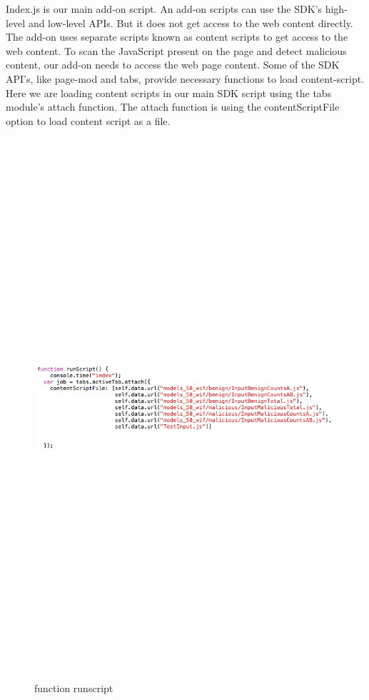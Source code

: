 Index.js is our main add-on script. An add-on scripts can use the SDK's high-level and low-level APIs. But it does not get access to the web content directly. The add-on uses separate scripts known as content scripts to get access to the web content.  To scan the JavaScript present on the page and detect malicious content, our add-on needs to access the web page content. Some of the SDK API's, like page-mod and tabs, provide necessary functions to load content-script. Here we are loading content scripts in our main SDK script using the tabs module's attach function. The attach function is using the contentScriptFile option to load content script as a file. 

\begin{figure}[htb]
\centering
\includegraphics[width=16cm,height=20cm,keepaspectratio]{image/runScript.png}
\caption[function runScript.js]{function runscript} 
\label{fig:runScript}
\end{figure}

